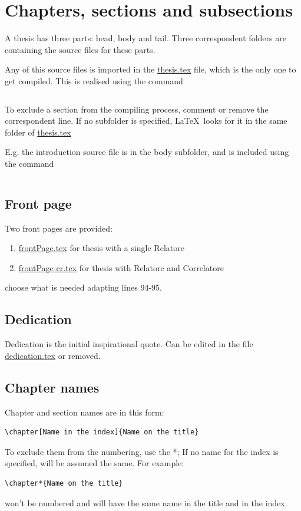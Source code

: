 \section[Sectioning]{Chapters, sections and subsections}

A thesis has three parts: head, body and tail. Three correspondent folders are containing the source files for these parts.

Any of this source files is imported in the \url{thesis.tex} file, which is the only one to get compiled. This is realised using the command
\begin{verbatim}

\end{verbatim}
To exclude a section from the compiling process, comment or remove the correspondent line. If no subfolder is specified, \LaTeX\ looks for it in the same folder of \url{thesis.tex}

E.g. the introduction source file is in the body subfolder, and is included using the command \begin{verbatim}  \end{verbatim}

\subsection{Front page}

Two front pages are provided:
\begin{enumerate}
	\item \url{frontPage.tex} for thesis with a single Relatore
	\item \url{frontPage-cr.tex} for thesis with Relatore and Correlatore
\end{enumerate}
choose what is needed adapting lines 94-95.

\subsection{Dedication}
Dedication is the initial inspirational quote. Can be edited in the file \url{dedication.tex} or removed.

\subsection{Chapter names}
Chapter and section names are in this form:
\begin{verbatim}
\chapter[Name in the index]{Name on the title}
\end{verbatim}
To exclude them from the numbering, use the *; If no name for the index is specified, will be assumed the same. For example:
\begin{verbatim}
\chapter*{Name on the title}
\end{verbatim}
won't be numbered and will have the same name in the title and in the index.

